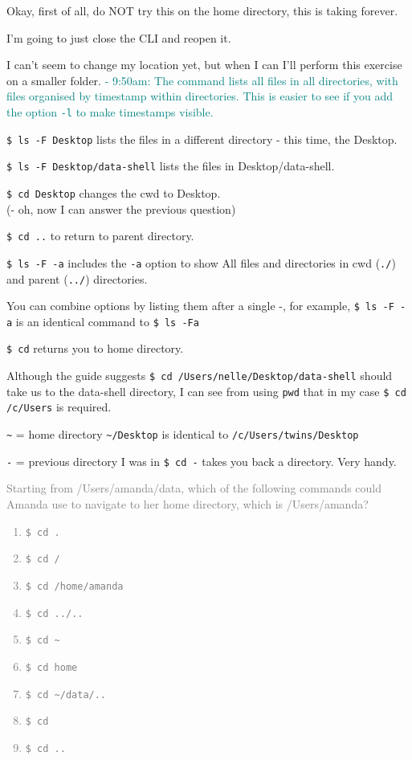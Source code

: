 \documentclass[12pt]{article}
\begin{document}
Okay, first of all, do NOT try this on the home directory, this is taking forever. 

I'm going to just close the CLI and reopen it.

I can't seem to change my location yet, but when I can I'll perform this exercise on a smaller folder. \textcolor{teal}{\small{- 9:50am: The command lists all files in all directories, with files organised by timestamp within directories. This is easier to see if you add the option \texttt{-l} to make timestamps visible.}}

\texttt{\$ ls -F Desktop} lists the files in a different directory - this time, the Desktop.

\texttt{\$ ls -F Desktop/data-shell} lists the files in Desktop/data-shell.

\texttt{\$ cd Desktop} changes the cwd to Desktop.
\\(- oh, now I can answer the previous question)

\texttt{\$ cd ..} to return to parent directory.

\texttt{\$ ls -F -a} includes the \texttt{-a} option to show All files and directories in cwd (\texttt{./}) and parent (\texttt{../}) directories.

You can combine options by listing them after a single -, for example, \texttt{\$ ls -F -a} is an identical command to \texttt{\$ ls -Fa}

\texttt{\$ cd} returns you to home directory.

Although the guide suggests \texttt{\$ cd /Users/nelle/Desktop/data-shell} should take us to the data-shell directory, I can see from using \texttt{pwd} that in my case \texttt{\$ cd /c/Users} is required.

\texttt{\textasciitilde} = home directory
\texttt{\textasciitilde/Desktop} is identical to \texttt{/c/Users/twins/Desktop}

\texttt{-} = previous directory I was in
\texttt{\$ cd -} takes you back a directory. Very handy.

\newpage
\textcolor{gray}{Starting from /Users/amanda/data, which of the following commands could Amanda use to navigate to her home directory, which is /Users/amanda?
\begin{enumerate}
    \item \texttt{\$ cd .}
    \item \texttt{\$ cd /}
    \item \texttt{\$ cd /home/amanda}
    \item \texttt{\$ cd ../..}
    \item \texttt{\$ cd \textasciitilde}
    \item \texttt{\$ cd home}
    \item \texttt{\$ cd \textasciitilde/data/..}
    \item \texttt{\$ cd}
    \item \texttt{\$ cd ..}
\end{enumerate}}
\end{document}

